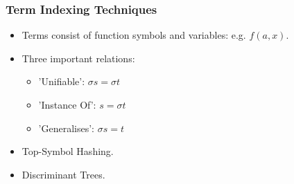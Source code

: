 \documentclass[10pt]{beamer}
\begin{document}
\begin{frame}
  \frametitle{Term Indexing Techniques}
  \begin{itemize}
  \item<1-> Terms consist of function symbols and variables: e.g. $f(a, x)$.
  \item<1-> Three important relations:
  \begin{itemize}
  \item<2-> 'Unifiable': $\sigma s = \sigma t$
  \item<2-> 'Instance Of': $s = \sigma t$
  \item<2-> 'Generalises': $\sigma s = t$
  \end{itemize}
  \item<3-> Top-Symbol Hashing.
  \item<3-> Discriminant Trees.
  \end{itemize}
\end{frame}
\end{document}
